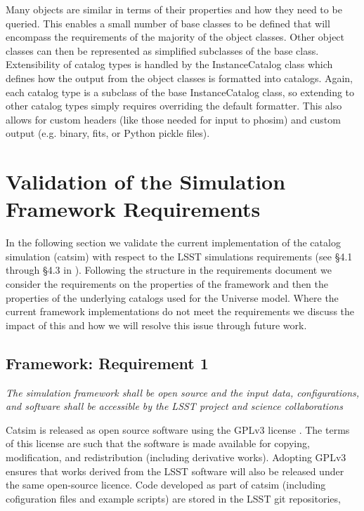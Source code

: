 \documentclass[]{article}
\begin{document}
{Many objects are similar in terms of their properties and how they
need to be queried.  This enables a small number of base classes to be
defined that will encompass the requirements of the majority of the
object classes.  Other object classes can then be represented as
simplified subclasses of the base class.  
Extensibility of catalog types is handled by the InstanceCatalog class
which defines how the output from the object classes is formatted into
catalogs.  Again, each catalog  type is a subclass of the base
InstanceCatalog class, so extending to other catalog types simply
requires overriding the default formatter.  This also allows for
custom headers (like those needed for input to phosim) and custom
output (e.g. binary, fits, or Python pickle files).



\section{Validation of the Simulation Framework Requirements}

In the following section we validate the current implementation of the
catalog simulation (catsim) with respect to the LSST simulations
requirements (see \S 4.1 through \S 4.3 in
\citealt{requirements}). Following the structure in the requirements
document we consider the requirements on the properties of the
framework and then the properties of the underlying catalogs used for
the Universe model.  Where the current framework implementations do
not meet the requirements we discuss the impact of this and how we
will resolve this issue through future work.

\subsection{Framework: Requirement 1}

{\it  The simulation framework shall be open source and the input data, configurations,
and software shall be accessible by the LSST project and science
collaborations}

Catsim is released as open source software using the GPLv3 license
\citep{XXX}. The terms of this license are such that the software is
made available for copying, modification, and redistribution
(including derivative works). Adopting GPLv3 ensures that works
derived from the LSST software will also be released under the same
open-source licence. Code developed as part of catsim (including
cofiguration files and example scripts) are stored in the LSST 
git repositories,

}
\end{document}
